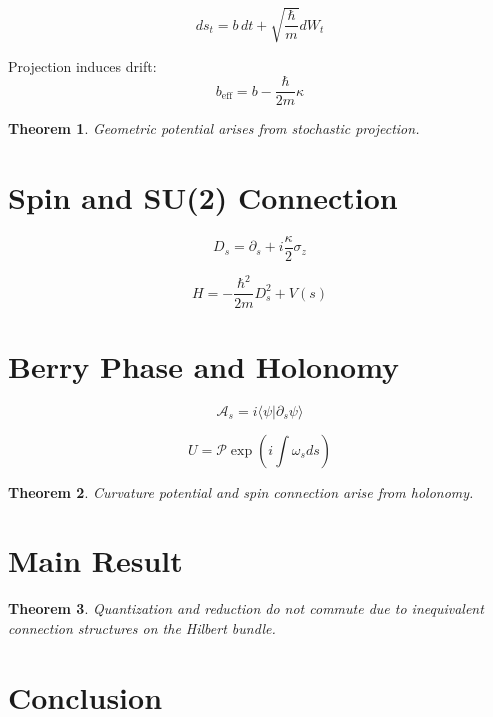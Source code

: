 \documentclass[11pt]{article}
\newtheorem{theorem}{Theorem}[section]
\begin{document}
\begin{equation}
ds_t = b\,dt + \sqrt{\frac{\hbar}{m}}dW_t
\end{equation}

Projection induces drift:
\[
b_{\mathrm{eff}} = b - \frac{\hbar}{2m}\kappa
\]

\begin{theorem}
Geometric potential arises from stochastic projection.
\end{theorem}

\section{Spin and SU(2) Connection}

\begin{equation}
D_s = \partial_s + i\frac{\kappa}{2}\sigma_z
\end{equation}

\begin{equation}
H =
-\frac{\hbar^2}{2m}D_s^2 + V(s)
\end{equation}

\section{Berry Phase and Holonomy}

\begin{equation}
\mathcal{A}_s = i\langle \psi|\partial_s\psi\rangle
\end{equation}

\begin{equation}
U = \mathcal{P}\exp\left(i\int \omega_s ds\right)
\end{equation}

\begin{theorem}
Curvature potential and spin connection arise from holonomy.
\end{theorem}

\section{Main Result}

\begin{theorem}
Quantization and reduction do not commute due to inequivalent connection structures on the Hilbert bundle.
\end{theorem}

\section{Conclusion}
\end{document}
